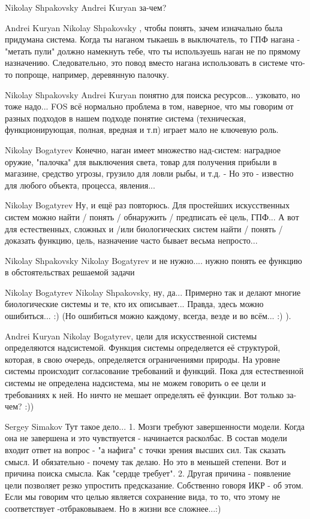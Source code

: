 \documentclass[11pt,a4paper]{article}
\begin{document}
Nikolay Shpakovsky Andrei Kuryan за-чем?

Andrei Kuryan Nikolay Shpakovsky , чтобы понять, зачем изначально была
придумана система.  Когда ты наганом тыкаешь в выключатель, то ГПФ нагана -
"метать пули" должно намекнуть тебе, что ты используешь наган не по прямому
назначению. Следовательно, это повод вместо нагана использовать в системе
что-то попроще, например, деревянную палочку.

Nikolay Shpakovsky Andrei Kuryan понятно для поиска ресурсов... узковато, но
тоже надо... FOS всё нормально проблема в том, наверное, что мы говорим от
разных подходов в нашем подходе понятие система (техническая, функционирующая,
полная, вредная и т.п) играет мало не ключевую роль.

Nikolay Bogatyrev Конечно, наган имеет множество над-систем: наградное оружие,
"палочка" для выключения света, товар для получения прибыли в магазине,
средство угрозы, грузило для ловли рыбы, и т.д. - Но это - известно для любого
объекта, процесса, явления...

Nikolay Bogatyrev Ну, и ещё раз повторюсь. Для простейших искусственных систем
можно найти / понять / обнаружить / предписать её цель, ГПФ... А вот для
естественных, сложных и /или биологических систем найти / понять / доказать
функцию, цель, назначение часто бывает весьма непросто...

Nikolay Shpakovsky Nikolay Bogatyrev и не нужно.... нужно понять ее функцию в
обстоятельствах решаемой задачи

Nikolay Bogatyrev Nikolay Shpakovsky, ну, да... Примерно так и делают многие
биологические системы и те, кто их описывает... Правда, здесь можно
ошибиться... :) (Но ошибиться можно каждому, всегда, везде и во всём... :) ).

Andrei Kuryan Nikolay Bogatyrev, цели для искусственной системы определяются
надсистемой. Функция системы определяется её структурой, которая, в свою
очередь, определяется ограничениями природы. На уровне системы происходит
согласование требований и функций.  Пока для естественной системы не
определена надсистема, мы не можем говорить о ее цели и требованиях к ней. Но
ничто не мешает определять её функции. Вот только за-чем? :))

Sergey Simakov Тут такое дело...  1. Мозги требуют завершенности модели. Когда
она не завершена и это чувствуется - начинается расколбас. В состав модели
входит ответ на вопрос - "а нафига" с точки зрения высших сил. Так сказать
смысл. И обязательно - почему так делаю. Но это в меньшей степени.  Вот и
причина поиска смысла. Как "сердце требует".  2. Другая причина - появление
цели позволяет резко упростить предсказание. Собственно говоря ИКР - об этом.
Если мы говорим что целью является сохранение вида, то то, что этому не
соответствует -отбраковываем. Но в жизни все сложнее...:)
\end{document}
